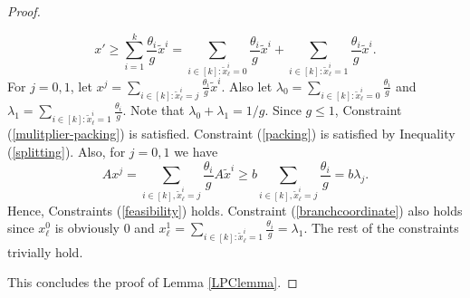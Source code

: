 \begin{proof}
\begin{cproof}
		\begin{equation}\label{splitting}
		x'\geq \sum_{i=1}^{k}\frac{\theta_i}{g} \tilde{x}^i
		={\sum_{i\in [k]: \tilde{x}^i_\ell =0}\frac{\theta_i}{g} \tilde{x}^i}+{\sum_{i\in [k]: \tilde{x}^i_\ell =1}\frac{\theta_i}{g} \tilde{x}^i}.
		\end{equation}
		For $j=0,1$, let $x^j = \sum_{i\in [k]:\tilde{x}^i_\ell=j} \frac{\theta_i}{g}\tilde{x}^i$. Also let $\lambda_0=\sum_{i\in [k]: \tilde{x}^i_\ell =0}\frac{\theta_i}{g}$ and $\lambda_1 = \sum_{i\in [k]: \tilde{x}^i_\ell =1}\frac{\theta_i}{g}$. Note that $\lambda_0+\lambda_1 =1/g$. Since $g\leq 1$, Constraint (\ref{mulitplier-packing}) is satisfied. Constraint (\ref{packing}) is satisfied by Inequality (\ref{splitting}). Also, for $j=0,1$ we have
		\begin{equation}
		Ax^j= \sum_{i\in[k], \tilde{x}^i_\ell = j} \frac{\theta_i}{g} A\tilde{x}^i  \geq b \sum_{i\in[k], \tilde{x}^i_\ell = j} \frac{\theta_i}{g} = b\lambda_j.
		\end{equation}
		Hence, Constraints (\ref{feasibility}) holds. Constraint (\ref{branchcoordinate}) also holds since $x^0_\ell$ is obviously $0$ and $x^1_\ell= \sum_{i\in [k]: \tilde{x}^i_\ell = 1}\frac{\theta_i}{g}= \lambda_1$. The rest of the constraints trivially hold. 
	\end{cproof}
	This concludes the proof of Lemma \ref{LPClemma}.	
\end{proof}

